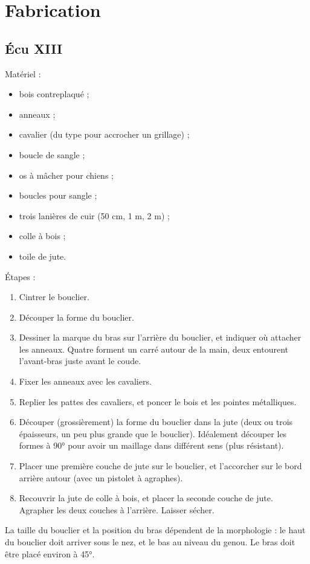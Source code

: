 \chapter{Fabrication}

\section{Écu XIII\ieme{}}

% 

Matériel :
\begin{itemize}
	\item bois contreplaqué ;
	\item anneaux ;
	\item cavalier (du type pour accrocher un grillage) ;
	\item boucle de sangle ;
	\item os à mâcher pour chiens ;
	\item boucles pour sangle ;
	\item trois lanières de cuir (50 cm, 1 m, 2 m) ;
	\item colle à bois ;
	\item toile de jute.
\end{itemize}
\bigskip

Étapes :
\begin{enumerate}
	\item Cintrer le bouclier.
	\item Découper la forme du bouclier.
	\item Dessiner la marque du bras sur l'arrière du bouclier, et indiquer où attacher les anneaux. Quatre forment un carré autour de la main, deux entourent l'avant-bras juste avant le coude.
	\item Fixer les anneaux avec les cavaliers.
	\item Replier les pattes des cavaliers, et poncer le bois et les pointes métalliques.
	\item Découper (grossièrement) la forme du bouclier dans la jute (deux ou trois épaisseurs, un peu plus grande que le bouclier). Idéalement découper les formes à 90° pour avoir un maillage dans différent sens (plus résistant).
	\item Placer une première couche de jute sur le bouclier, et l'accorcher sur le bord arrière autour (avec un pistolet à agraphes).
	\item Recouvrir la jute de colle à bois, et placer la seconde couche de jute. Agrapher les deux couches à l'arrière. Laisser sécher.
\end{enumerate}
\bigskip

La taille du bouclier et la position du bras dépendent de la morphologie : le haut du bouclier doit arriver sous le nez, et le bas au niveau du genou.
Le bras doit être placé environ à 45°.
